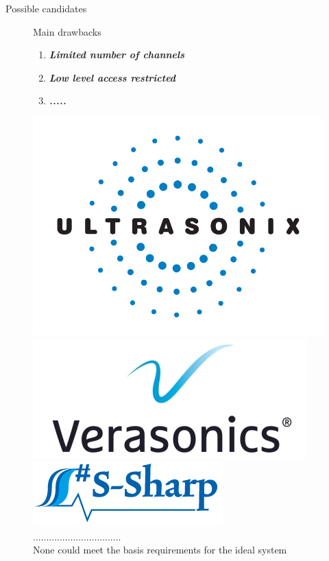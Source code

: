 \documentclass[t,12pt,english
\ifx\beamermode\undefined\else,\beamermode\fi
]{beamer}
\begin{document}
\begin{frame}{Possible candidates}


\begin{figure}[!htb]

\begin{block}{\footnotesize{Main drawbacks}}\tiny{}
\begin{enumerate} 
\vspace{0.05cm}
     \item \tiny{\textbf{\textit{Limited number of channels}}}
     \item \tiny{\textbf{\textit{Low level access restricted}}} 
     \item \tiny{\textbf{\textit{.....}}}\\ 
   
\end{enumerate}
\end{block}

\endminipage
{}
\centering
\includegraphics[width=.6\textwidth]{37.jpg}\\
\includegraphics[width=.65\textwidth]{38.jpg}\\
\includegraphics[width=.6\textwidth]{39.png}\\
.................................\\  
\tiny{None could meet the basis requirements for the ideal system}

\endminipage
\end{figure}

\end{frame}
\end{document}

